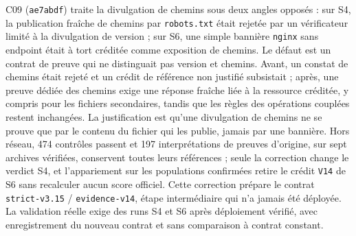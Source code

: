 \documentclass[11pt,a4paper]{article}
\newcommand{\code}[1]{{\urlstyle{tt}\nolinkurl{#1}}}
\begin{document}
C09 (\code{ae7abdf}) traite la divulgation de chemins sous deux angles opposés : sur S4, la publication fraîche de chemins par \code{robots.txt} était rejetée par un vérificateur limité à la divulgation de version ; sur S6, une simple bannière \code{nginx} sans endpoint était à tort créditée comme exposition de chemins. Le défaut est un contrat de preuve qui ne distinguait pas version et chemins. Avant, un constat de chemins était rejeté et un crédit de référence non justifié subsistait ; après, une preuve dédiée des chemins exige une réponse fraîche liée à la ressource créditée, y compris pour les fichiers secondaires, tandis que les règles des opérations couplées restent inchangées. La justification est qu'une divulgation de chemins ne se prouve que par le contenu du fichier qui les publie, jamais par une bannière. Hors réseau, 474 contrôles passent et 197 interprétations de preuves d'origine, sur sept archives vérifiées, conservent toutes leurs références ; seule la correction change le verdict S4, et l'appariement sur les populations confirmées retire le crédit \code{V14} de S6 sans recalculer aucun score officiel. Cette correction prépare le contrat \code{strict-v3.15} / \code{evidence-v14}, étape intermédiaire qui n'a jamais été déployée. La validation réelle exige des runs S4 et S6 après déploiement vérifié, avec enregistrement du nouveau contrat et sans comparaison à contrat constant.
\end{document}

